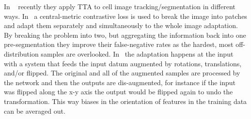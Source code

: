 In ~\cite{chen2024cmtt,Moshkov2020-uy} recently they apply TTA to cell image tracking/segmentation in different ways.  In~\cite{chen2024cmtt} a central-metric contrastive loss is used to break the image into patches and adapt them separately and simultaneously to the whole image adaptation.  By breaking the problem into two, but aggregating the information back into one pre-segmentation they improve their false-negative rates as the hardest, most off-distribution samples are overlooked.   In~\cite{Moshkov2020-uy} the adaptation happens at the input with a system that feeds the input datum augmented by rotations, translations, and/or flipped.  The original and all of the augmented samples are processed by the network and then the outputs are dis-augmented, for instance if the input was flipped along the x-y axis the output would be flipped again to undo the transformation.  This way biases in the orientation of features in the training data can be averaged out.  





